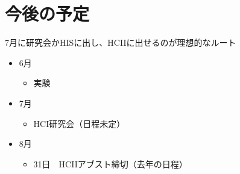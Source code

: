 \documentclass[11pt,a4paper]{jarticle}
\begin{document}
\section{今後の予定}
7月に研究会かHISに出し、HCIIに出せるのが理想的なルート
\begin{itemize}
  \item 6月
  \begin{itemize}
    \item 実験
  \end{itemize}
  \item 7月
  \begin{itemize}
    \item HCI研究会（日程未定）
  \end{itemize}
  \item 8月
  \begin{itemize}
    \item 31日　HCIIアブスト締切（去年の日程）
  \end{itemize}
\end{itemize}


\end{document}
